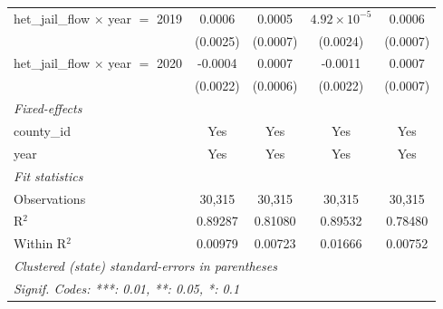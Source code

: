 \begin{tabular}{lcccc}
   het\_jail\_flow $\times$ year $=$ 2019                & 0.0006                 & 0.0005                    & $4.92\times 10^{-5}$   & 0.0006\\   
                                                         & (0.0025)               & (0.0007)                  & (0.0024)               & (0.0007)\\   
   het\_jail\_flow $\times$ year $=$ 2020                & -0.0004                & 0.0007                    & -0.0011                & 0.0007\\   
                                                         & (0.0022)               & (0.0006)                  & (0.0022)               & (0.0007)\\   
   \midrule
   \emph{Fixed-effects}\\
   county\_id                                            & Yes                    & Yes                       & Yes                    & Yes\\  
   year                                                  & Yes                    & Yes                       & Yes                    & Yes\\  
   \midrule
   \emph{Fit statistics}\\
   Observations                                          & 30,315                 & 30,315                    & 30,315                 & 30,315\\  
   R$^2$                                                 & 0.89287                & 0.81080                   & 0.89532                & 0.78480\\  
   Within R$^2$                                          & 0.00979                & 0.00723                   & 0.01666                & 0.00752\\  
   \midrule \midrule
   \multicolumn{5}{l}{\emph{Clustered (state) standard-errors in parentheses}}\\
   \multicolumn{5}{l}{\emph{Signif. Codes: ***: 0.01, **: 0.05, *: 0.1}}\\
\end{tabular}
\par\endgroup


